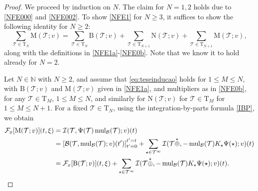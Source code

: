 \documentclass[%
11pt,  reqno]{amsart}
\makeatletter
\newcommand{\5}{\textup{V}}
\theoremstyle{remark}
\newcommand{\TT}{\mathcal{T}}
\newcommand{\Tr}{\mathrm{T}}
\newcommand{\Ft}{{\mathcal{F}}}
\newcommand{\N}{\mathbb{N}}
\DeclareMathOperator{\mulB}{mul_{\mathcal{B}}}
\def\<#1>{\csname MH@symb@#1\endcsname}
\newcommand{\B}{\mathcal{B}}
\newcommand{\Ical}{\mathcal{I}}
\numberwithin{equation}{section}
\numberwithin{theorem}{section}
\newcommand{\MM}{\mathrm{M}}
\newcommand{\NN}{\mathrm{N}}
\newcommand{\BB}{\mathrm{B}}
\makeatother
\begin{document}
\begin{proof}



We proceed by induction on $N$. 
The claim for $N=1,2$ holds due to \eqref{NFE000} and \eqref{NFE002}.
To show \eqref{NFE1} for $N\ge3$, it suffices to show the following identity for $N\ge 2$:
\begin{equation}\label{eq:teseinducao}
\sum_{\TT\in\Tr_{N}} \MM(\TT; v) 
= 
\sum_{\TT\in \Tr_{N}} \BB(\TT; v) 
+
\sum_{\TT\in \Tr_{N+1}} \NN(\TT; v) 
+ \sum_{\TT\in \Tr_{N+1}} \MM(\TT; v),
\end{equation}
along with the definitions in \eqref{NFE1a}-\eqref{NFE0b}. Note that we know it to hold already for $N=2$. 


Let $N\in \N$ with $N\ge2$, and assume that \eqref{eq:teseinducao} holds for $1\le M \le N$, 
with $\BB(\TT; v)$ and $\MM(\TT; v)$ given in \eqref{NFE1a}, and multipliers as in \eqref{NFE0b}, for any $\TT\in \Tr_M$, $1\le M \le N$, and similarly for $\NN(\TT; v)$ for $\TT\in \Tr_M$ for $1\le M \le N+1$.
For a fixed $\TT\in\Tr_{N}$, using the integration-by-parts formula \eqref{IBP}, we obtain
\begin{align*}
\Ft_x [\MM(\TT; v) ](t,\xi) 
&
=\Ical(\TT, \Psi(\TT)\mulB(\TT); v)(t)
\\
& =
\left[\B(\TT,\mulB(\TT); v)(t')\right]_{t'=0}^{t'=t} +
\sum_{\star\in\TT^\infty}
\Ical (\TT \overset{\star}{\oplus} \<1>, -\mulB(\TT) K_\star \Psi(\star) ; v )(t)
\\
&
= \Ft_x[\BB(\TT; v) ](t, \xi)  
+
\sum_{\star\in\TT^\infty} \Ical (\TT \overset{\star}{\oplus} \<1>, -\mulB(\TT) K_\star \Psi(\star) ; v) (t) .
\end{align*}




\end{proof}
\end{document}
